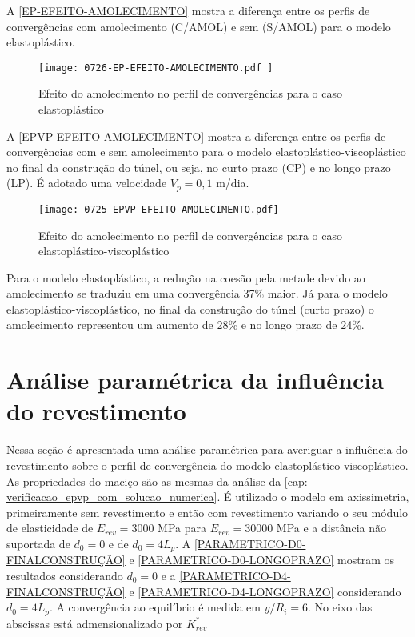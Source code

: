A \autoref{EP-EFEITO-AMOLECIMENTO} mostra a diferença entre os perfis de convergências com amolecimento (C/AMOL) e sem (S/AMOL) para o modelo elastoplástico.

\begin{figure}[H]
	\begin{center}
		\texttt{[image: 0726-EP-EFEITO-AMOLECIMENTO.pdf
		]}
	\end{center}
	\caption{\label{EP-EFEITO-AMOLECIMENTO}Efeito do amolecimento no perfil de convergências para o caso elastoplástico}
\end{figure}

A \autoref{EPVP-EFEITO-AMOLECIMENTO} mostra a diferença entre os perfis de convergências com e sem amolecimento para o modelo elastoplástico-viscoplástico no final da construção do túnel, ou seja, no curto prazo (CP) e no longo prazo (LP). É adotado uma velocidade $V_p=0,1$ m/dia.

\begin{figure}[H]
	\begin{center}
		\texttt{[image: 0725-EPVP-EFEITO-AMOLECIMENTO.pdf]}
	\end{center}
	\caption{\label{EPVP-EFEITO-AMOLECIMENTO}Efeito do amolecimento no perfil de convergências para o caso elastoplástico-viscoplástico}
\end{figure}

Para o modelo elastoplástico, a redução na coesão pela metade devido ao amolecimento se traduziu em uma convergência 37\% maior. Já para o modelo elastoplástico-viscoplástico, no final da construção do túnel (curto prazo) o amolecimento representou um aumento de 28\% e no longo prazo de 24\%.


\section{Análise paramétrica da influência do revestimento}

Nessa seção é apresentada uma análise paramétrica para averiguar a influência do revestimento sobre o perfil de convergência do modelo elastoplástico-viscoplástico. As propriedades do maciço são as mesmas da análise da \autoref{cap: verificacao_epvp_com_solucao_numerica}. É utilizado o modelo em axissimetria, primeiramente sem revestimento e então com revestimento variando o seu módulo de elasticidade de $E_{rev} = 3000$ MPa para $E_{rev} = 30000$ MPa e a distância não suportada de $d_0 = 0$ e de $d_0 = 4L_p$. A \autoref{PARAMETRICO-D0-FINALCONSTRUÇÃO} e \autoref{PARAMETRICO-D0-LONGOPRAZO} mostram os resultados considerando $d_0 = 0$ e a \autoref{PARAMETRICO-D4-FINALCONSTRUÇÃO} e \autoref{PARAMETRICO-D4-LONGOPRAZO} considerando $d_0=4L_p$. A convergência ao equilíbrio é medida em $y/R_i = 6$. No eixo das abscissas está admensionalizado por $K_{rev}^*$

